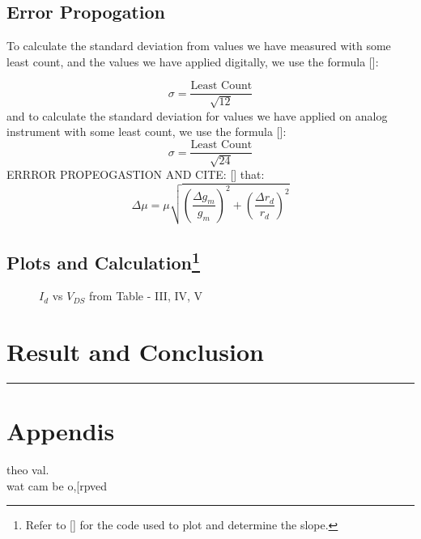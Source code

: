 \documentclass[%
sor,
 jor,
 amsmath,amssymb,
 reprint,
]{revtex4-2}
\begin{document}
\subsection{Error Propogation}
To calculate the standard deviation from values we have measured with some least count, and the values we have applied digitally, we use the formula [\cite{tewari_uncertainty}]: 

\begin{equation}
\sigma = \frac{\text{Least Count}}{\sqrt{12}}
\end{equation}
and to calculate the standard deviation for values we have applied on analog instrument with some least count, we use the formula [\cite{tewari_uncertainty}]: 
\begin{equation}
\sigma = \frac{\text{Least Count}}{\sqrt{24}}
\end{equation}
ERRROR PROPEOGASTION AND CITE:
[\cite{taylor_error_analysis}] that: 
\begin{equation}
	\Delta \mu = \mu \sqrt {\left( \frac {\Delta g_m }{g_m} \right)^2 + \left( \frac {\Delta r_d}{r_d} \right)^2}
\end{equation}

\subsection{Plots and Calculation\footnote{Refer to [\cite{ph3244repo}] for the code used to plot and determine the slope.}}
\begin{figure}[H]
\begin{minipage}{0.48\linewidth}
\begin{center}
	\caption{$I_d$ vs $V_{GS}$ from Table - I, II}
\end{center}

\end{minipage}
\begin{minipage}{0.48\linewidth}
\begin{center}
	\caption{$I_d$ vs $V_{DS}$ from Table - III, IV, V}
\end{center}
\end{minipage}
\end{figure}






\section{Result and Conclusion}

\cite{ph3244repo}
\cite{tewari_uncertainty}
\cite{taylor_error_analysis}
\cite{standard_error_wiki}

\vspace{1cm}
\hrule
\vspace{1cm}
\appendix
\section{Appendis}
theo val.\\
wat cam be o,[rpved



\end{document}
